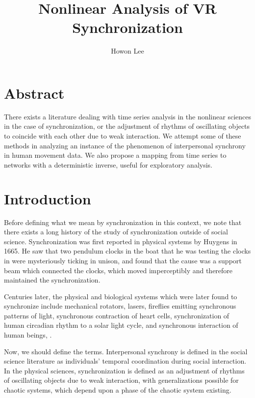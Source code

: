 \documentclass[12pt]{article}
\begin{document}
\title{Nonlinear Analysis of VR Synchronization}
\author{Howon Lee}
\maketitle

\section{Abstract}
There exists a literature dealing with time series analysis in the nonlinear sciences in the case of synchronization, or the adjustment of rhythms of oscillating objects to coincide with each other due to weak interaction. We attempt some of these methods in analyzing an instance of the phenomenon of interpersonal synchrony in human movement data. We also propose a mapping from time series to networks with a deterministic inverse, useful for exploratory analysis.


\section{Introduction}

Before defining what we mean by synchronization in this context, we note that there exists a long history of the study of synchronization outside of social science. Synchronization was first reported in physical systems by Huygens in 1665. He saw that two pendulum clocks in the boat that he was testing the clocks in were mysteriously ticking in unison, and found that the cause was a support beam which connected the clocks, which moved imperceptibly and therefore maintained the synchronization\cite{physsync}.

Centuries later, the physical and biological systems which were later found to synchronize include mechanical rotators, lasers, fireflies emitting synchronous patterns of light, synchronous contraction of heart cells, synchronization of human circadian rhythm to a solar light cycle, and synchronous interaction of human beings\cite{syncreview}, \cite{physsync}.

Now, we should define the terms. Interpersonal synchrony is defined in the social science literature as individuals' temporal coordination during social interaction\cite{socialsync}. In the physical sciences, synchronization is defined as an adjustment of rhythms of oscillating objects due to weak interaction, with generalizations possible for chaotic systems, which depend upon a phase of the chaotic system existing\cite{physsync}.
\end{document}
